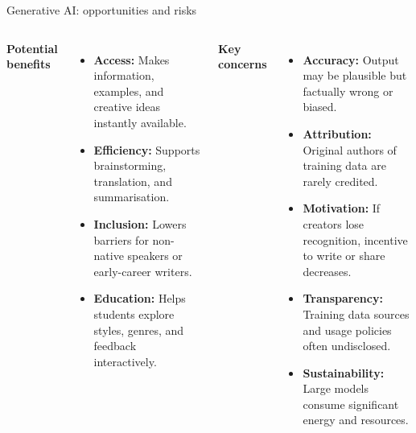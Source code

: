 \documentclass[aspectratio=169]{beamer}
\begin{document}
\begin{frame}{Generative AI: opportunities and risks}
\begin{columns}[T]
\textbf{Potential benefits}
\begin{itemize}
  \item \textbf{Access:} Makes information, examples, and creative ideas instantly available.  
  \item \textbf{Efficiency:} Supports brainstorming, translation, and summarisation.  
  \item \textbf{Inclusion:} Lowers barriers for non-native speakers or early-career writers.  
  \item \textbf{Education:} Helps students explore styles, genres, and feedback interactively.
\end{itemize}

\textbf{Key concerns}
\begin{itemize}
  \item \textbf{Accuracy:} Output may be plausible but factually wrong or biased.  
  \item \textbf{Attribution:} Original authors of training data are rarely credited.  
  \item \textbf{Motivation:} If creators lose recognition, incentive to write or share decreases.  
  \item \textbf{Transparency:} Training data sources and usage policies often undisclosed.  
  \item \textbf{Sustainability:} Large models consume significant energy and resources.
\end{itemize}
\end{columns}
\end{frame}
\end{document}
